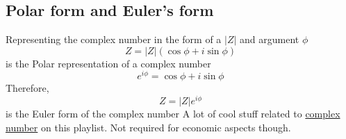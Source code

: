 \documentclass{article}
\begin{document}
\subsection*{Polar form and Euler's form}
Representing the complex number in the form of a $|Z|$ and argument $\phi$ 
\begin{equation*} Z = |Z| (\cos\phi+i \sin\phi)\end{equation*} is the Polar representation of a complex number
\begin{equation*} e^{i \phi} = \cos\phi + i \sin \phi \end{equation*}
Therefore, 
\begin{equation*} Z = |Z| e^{i \phi} \end{equation*} is the Euler form of the complex number 
A lot of cool stuff related to \href{https://www.youtube.com/playlist?list=PLJbzH0qGCsyrO7lUmdEQAzJInNlwwUgp0}{complex number} on this playlist. Not required for economic aspects though.
\end{document}
